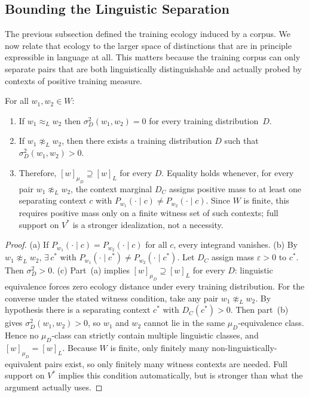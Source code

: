 \documentclass[twoside,11pt]{article}
\newcommand{\sigmasq}{\sigma^2}
\begin{document}
\subsection{Bounding the Linguistic Separation}

The previous subsection defined the training ecology induced by a corpus. We now relate that ecology to the larger space of distinctions that are in principle expressible in language at all. This matters because the training corpus can only separate pairs that are both linguistically distinguishable and actually probed by contexts of positive training measure.

\begin{proposition}\label{prop:ling-bound}
For all $w_1, w_2 \in W$:
\begin{enumerate}[label=(\alph*)]
\item If $w_1 \approx_L w_2$ then $\sigmasq_D(w_1, w_2) = 0$ for every training distribution~$D$.

\item If $w_1 \not\approx_L w_2$, then there exists a training distribution $D$ such that $\sigmasq_D(w_1, w_2) > 0$.

\item Therefore, $[w]_{\mu_D} \supseteq [w]_L$ for every $D$. Equality holds whenever, for every pair $w_1 \not\approx_L w_2$, the context marginal $D_C$ assigns positive mass to at least one separating context $c$ with $P_{w_1}(\cdot\mid c) \neq P_{w_2}(\cdot\mid c)$. Since $W$ is finite, this requires positive mass only on a finite witness set of such contexts; full support on $V^*$ is a stronger idealization, not a necessity.
\end{enumerate}
\end{proposition}

\begin{proof}
(a) If $P_{w_1}(\cdot\mid c) = P_{w_2}(\cdot\mid c)$ for all $c$, every integrand vanishes.
(b) By $w_1 \not\approx_L w_2$, $\exists\, c^*$ with $P_{w_1}(\cdot\mid c^*) \neq P_{w_2}(\cdot\mid c^*)$. Let $D_C$ assign mass $\varepsilon > 0$ to $c^*$. Then $\sigmasq_D > 0$.
(c) Part~(a) implies $[w]_{\mu_D} \supseteq [w]_L$ for every $D$: linguistic equivalence forces zero ecology distance under every training distribution. For the converse under the stated witness condition, take any pair $w_1 \not\approx_L w_2$. By hypothesis there is a separating context $c^*$ with $D_C(c^*) > 0$. Then part~(b) gives $\sigmasq_D(w_1,w_2) > 0$, so $w_1$ and $w_2$ cannot lie in the same $\mu_D$-equivalence class. Hence no $\mu_D$-class can strictly contain multiple linguistic classes, and $[w]_{\mu_D} = [w]_L$. Because $W$ is finite, only finitely many non-linguistically-equivalent pairs exist, so only finitely many witness contexts are needed. Full support on $V^*$ implies this condition automatically, but is stronger than what the argument actually uses.
\end{proof}
\end{document}
